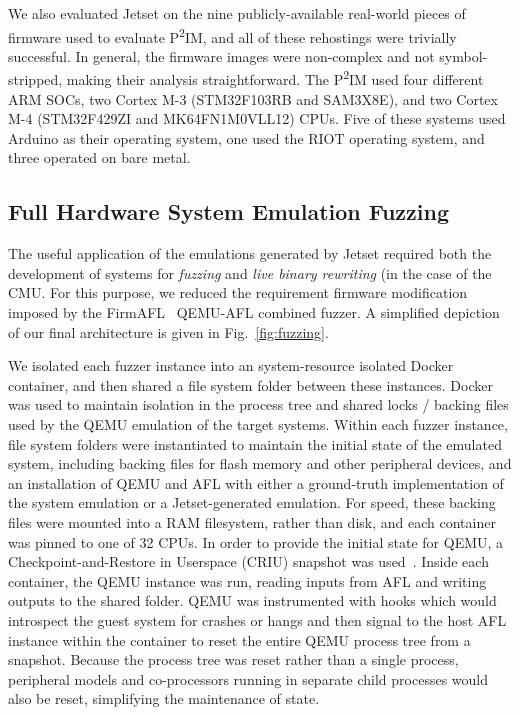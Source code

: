 We also evaluated Jetset on the nine publicly-available real-world pieces of firmware used to evaluate P\textsuperscript{2}IM\cite{p2im2020}, and all of these rehostings were trivially successful.
In general, the firmware images were non-complex and not symbol-stripped, making their analysis straightforward.
The P\textsuperscript{2}IM used four different ARM SOCs, two Cortex M-3 (STM32F103RB and
SAM3X8E), and two Cortex M-4 (STM32F429ZI and MK64FN1M0VLL12) CPUs.
Five of these systems used Arduino as their operating system, one used the RIOT operating system, and three operated on bare metal.

\subsection{Full Hardware System Emulation Fuzzing}

The useful application of the emulations generated by Jetset required both the development of systems for \emph{fuzzing} and \emph{live binary rewriting} (in the case of the CMU.
For this purpose, we reduced the requirement firmware modification imposed by the FirmAFL~\cite{zheng2019firm} QEMU-AFL combined fuzzer.
A simplified depiction of our final architecture is given in Fig.~\ref{fig:fuzzing}.

We isolated each fuzzer instance into an system-resource isolated Docker~\cite{docker2020docker} container, and then shared a file system folder between these instances.
Docker was used to maintain isolation in the process tree and shared locks / backing files used by the QEMU emulation of the target systems.
Within each fuzzer instance, file system folders were instantiated to maintain the initial state of the emulated system, including backing files for flash memory and other peripheral devices, and an installation of QEMU and AFL with either a ground-truth implementation of the system emulation or a Jetset-generated emulation.
For speed, these backing files were mounted into a RAM filesystem, rather than disk, and each container was pinned to one of 32 CPUs.
In order to provide the initial state for QEMU, a Checkpoint-and-Restore in Userspace (CRIU) snapshot was used~\cite{venkatesh2019fast}.
Inside each container, the QEMU instance was run, reading inputs from AFL and writing outputs to the shared folder.
QEMU was instrumented with hooks which would introspect the guest system for crashes or hangs and then signal to the host AFL instance within the container to reset the entire QEMU process tree from a snapshot.
Because the process tree was reset rather than a single process, peripheral models and co-processors running in separate child processes would also be reset, simplifying the maintenance of state.

